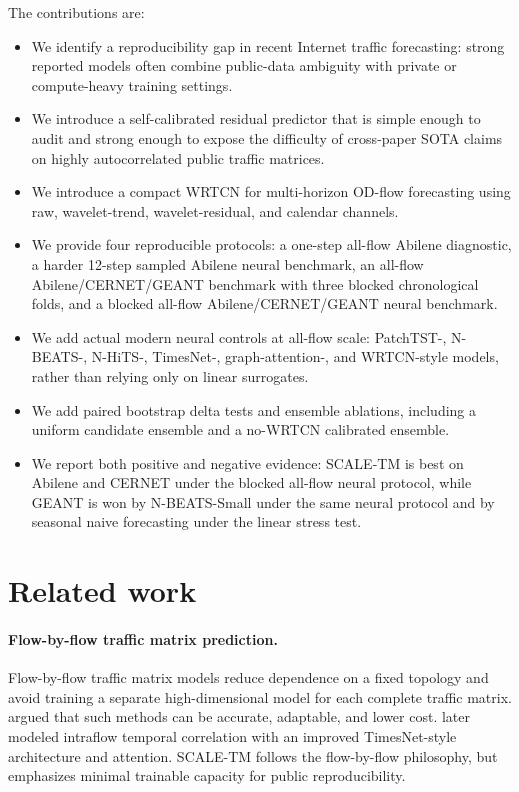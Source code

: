 \documentclass{article}
\begin{document}
The contributions are:
\begin{itemize}[leftmargin=1.25em]
\item We identify a reproducibility gap in recent Internet traffic forecasting: strong reported models often combine public-data ambiguity with private or compute-heavy training settings.
\item We introduce a self-calibrated residual predictor that is simple enough to audit and strong enough to expose the difficulty of cross-paper SOTA claims on highly autocorrelated public traffic matrices.
\item We introduce a compact WRTCN for multi-horizon OD-flow forecasting using raw, wavelet-trend, wavelet-residual, and calendar channels.
\item We provide four reproducible protocols: a one-step all-flow Abilene diagnostic, a harder 12-step sampled Abilene neural benchmark, an all-flow Abilene/CERNET/GEANT benchmark with three blocked chronological folds, and a blocked all-flow Abilene/CERNET/GEANT neural benchmark.
\item We add actual modern neural controls at all-flow scale: PatchTST-, N-BEATS-, N-HiTS-, TimesNet-, graph-attention-, and WRTCN-style models, rather than relying only on linear surrogates.
\item We add paired bootstrap delta tests and ensemble ablations, including a uniform candidate ensemble and a no-WRTCN calibrated ensemble.
\item We report both positive and negative evidence: SCALE-TM is best on Abilene and CERNET under the blocked all-flow neural protocol, while GEANT is won by N-BEATS-Small under the same neural protocol and by seasonal naive forecasting under the linear stress test.
\end{itemize}

\section{Related work}

\paragraph{Flow-by-flow traffic matrix prediction.}
Flow-by-flow traffic matrix models reduce dependence on a fixed topology and avoid training a separate high-dimensional model for each complete traffic matrix. \citet{zheng2022flow} argued that such methods can be accurate, adaptable, and lower cost. \citet{lu2025intraflow} later modeled intraflow temporal correlation with an improved TimesNet-style architecture and attention. SCALE-TM follows the flow-by-flow philosophy, but emphasizes minimal trainable capacity for public reproducibility.
\end{document}
